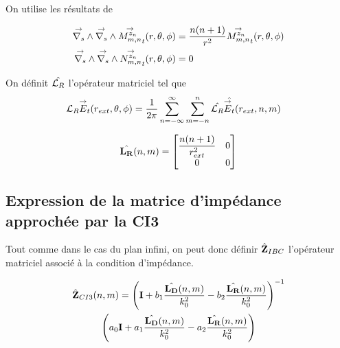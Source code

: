     On utilise les résultats de \cite{marceaux_high-order_2000}

    \begin{align*}
      \vrots{}\vrots{} \Mmn[z_n]_t(r,\theta,\phi) &= \frac{n(n+1)}{r^2}\Mmn[z_n]_t(r,\theta,\phi)
      \\
      \vrots{}\vrots{} \Nmn[z_n]_t(r,\theta,\phi) &= 0
    \end{align*}

    On définit \(\hat{\LR}\) l'opérateur matriciel tel que
    \begin{align}
      \LR \vE_t(r_{ext},\theta,\phi)
      &= \frac{1}{2\pi}\sum_{n=-\infty}^\infty\sum_{m=-n}^n \hat{\LR} \hat{\vE_t}(r_{ext},n,m)
    \end{align}

    \begin{equation}
      \hat{\mLR}(n,m) =
      \begin{bmatrix}
        \frac{n(n+1)}{r_{ext}^2} & 0
        \\
        0 & 0
      \end{bmatrix}
    \end{equation}

  \subsection{Expression de la matrice d'impédance approchée par la CI3}

    Tout comme dans le cas du plan infini, on peut donc définir \(\hat{\mZ}_{IBC}\) l’opérateur matriciel associé à la condition d'impédance.

    \begin{multline}
        \hat{\mZ}_{CI3}(n,m) = \left(\mI + b_1 \frac{\hat{\mLD}(n,m)}{k_0^2} - b_2 \frac{\hat{\mLR}(n,m)}{k_0^2} \right)^{-1}\\
        \left(a_0 \mI + a_1 \frac{\hat{\mLD}(n,m)}{k_0^2} - a_2 \frac{\hat{\mLR}(n,m)}{k_0^2}\right)
    \end{multline}
